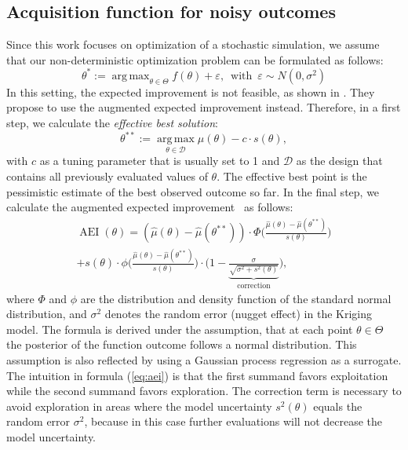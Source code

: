 \documentclass[bimj,fleqn]{w-art}
\theoremstyle{plain}
\theoremstyle{definition}
\begin{document}
\subsection{Acquisition function for noisy outcomes}
Since this work focuses on optimization of a stochastic simulation, we assume that our non-deterministic optimization problem can be formulated as follows:
\begin{equation}
\theta^\ast := \operatorname{arg\,max}_{\theta \in \Theta} f(\theta) + \varepsilon, \, \text{ with } \, \varepsilon \sim N(0, \sigma^2) %
\end{equation}
In this setting, the expected improvement is not feasible, as shown in \citet{huang_global_2006}.
They propose to use the augmented expected improvement instead.
Therefore, in a first step, we calculate the \emph{effective best solution}:
\begin{equation}
  \theta^{\ast\ast} := \operatorname{arg\,max}\limits_{\theta \in \mathcal{D}} \hat{\mu}(\theta) - c \cdot s(\theta),
\end{equation}
with $c$ as a tuning parameter that is usually set to 1 and $\mathcal{D}$ as the design that contains all previously evaluated values of $\theta$.
The effective best point is the pessimistic estimate of the best observed outcome so far.
In the final step, we calculate the augmented expected improvement~\citep{huang_global_2006} as follows:
\begin{multline}
  \label{eq:aei}
  \operatorname{AEI}(\theta) = \left( \hat{\mu}(\theta) - \hat{\mu}(\theta^{\ast\ast}) \right) \cdot  \Phi \biggl( \frac{\hat{\mu}(\theta) - \hat{\mu}(\theta^{\ast\ast})}{s(\theta)} \biggr) \\
   + s(\theta) \cdot \phi \biggl( \frac{\hat{\mu}(\theta) - \hat{\mu}(\theta^{\ast\ast})}{s(\theta)} \biggr) \cdot \biggl(1 - \underbrace{\frac{\sigma}{\sqrt{\sigma^2 + s^2(\theta)}}}_{\text{correction}}\biggr),
\end{multline}
where $\Phi$ and $\phi$ are the distribution and density function of the standard normal distribution, and $\sigma^2$ denotes the random error (nugget effect) in the Kriging model.
The formula is derived under the assumption, that at each point $\theta \in \Theta$ the posterior of the function outcome follows a normal distribution.
This assumption is also reflected by using a Gaussian process regression as a surrogate.
The intuition in formula (\ref{eq:aei}) is that the first summand favors exploitation while the second summand favors exploration.
The correction term is necessary to avoid exploration in areas where the model uncertainty $s^2(\theta)$ equals the random error $\sigma^2$, because in this case further evaluations will not decrease the model uncertainty.
\end{document}
